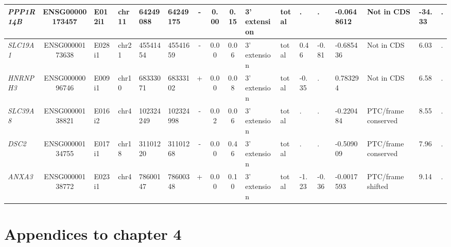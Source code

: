 \begin{landscape}
\begin{table}
{\begin{tabular}{|l|c|l|l|l|l|c|c|c|l|l|l|l|l|l|l|l|}
		\textit{PPP1R14B} & ENSG00000173457 & E012i1 & chr11 & 64249088 & 64249175 & -     & 0.00  & 0.15  & 3' extension & total & . & . & -0.0648612 & Not in CDS     & -34.33 & . \\ \hline
		\textit{SLC19A1} & ENSG00000173638 & E028i1 & chr21 & 45541454 & 45541659 & -     & 0.00  & 0.06  & 3' extension & total & 0.46  & -0.81 & -0.685436 & Not in CDS     & 6.03  & . \\ \hline
		\textit{HNRNPH3} & ENSG00000096746 & E009i1 & chr10 & 68333071 & 68333102 & +     & 0.00  & 0.08  & 3' extension & total & -0.35 & . & 0.783294 & Not in CDS     & 6.58  & . \\ \hline
		\textit{SLC39A8} & ENSG00000138821 & E016i2 & chr4  & 102324249 & 102324998 & -     & 0.02  & 0.06  & 3' extension & total & . & . & -0.220484 & PTC/frame conserved & 8.55  & . \\ \hline
		\textit{DSC2} & ENSG00000134755 & E017i1 & chr18 & 31101220 & 31101268 & -     & 0.00  & 0.46  & 3' extension & total & . & . & -0.509009 & PTC/frame conserved & 7.96  & . \\ \hline
		\textit{ANXA3} & ENSG00000138772 & E023i1 & chr4  & 78600147 & 78600348 & +     & 0.00  & 0.10  & 3' extension & total & -1.23 & -0.36 & -0.0017593 & PTC/frame shifted & 9.14  & . \\ \hline
	\end{tabular}%
	} 
\end{table}%

\end{landscape}

\addtolength{\abovecaptionskip}{25mm}

\clearpage


\section{Appendices to chapter 4}

